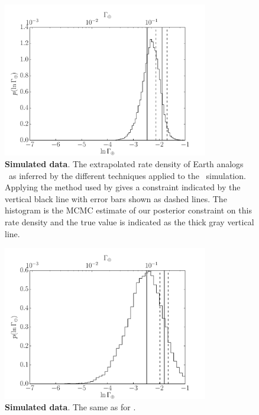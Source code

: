 \begin{figure}[p]
\begin{center}
\includegraphics[width=0.8\textwidth]{figures/exopop/smooth/rate.pdf}
\end{center}
\caption{%
{\bf Simulated data}.
The extrapolated rate density of Earth analogs \gammaearth\ as inferred by the
different techniques applied to the \modela\ simulation.
Applying the method used by \citet{Petigura:2013} gives a constraint indicated by
the vertical black line with error bars shown as dashed lines.
The histogram is the MCMC estimate of our posterior constraint on this rate
density and the true value is indicated as the thick gray vertical line.
}
\end{figure}

\begin{figure}[p]
\begin{center}
\includegraphics[width=0.8\textwidth]{figures/exopop/simulation/rate.pdf}
\end{center}
\caption{%
{\bf Simulated data}.
The same as  for \modelb.
}
\end{figure}

